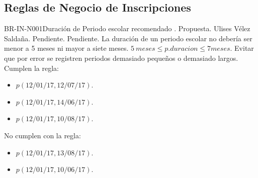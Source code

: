 
\subsection{Reglas de Negocio de Inscripciones}

\begin{BusinessRule}{BR-IN-N001}{Duración de Periodo escolar recomendado }
	{\bcCondition}    %
	{\btEnabler}     %
	{\blInfluencing}    %
	.
	\BRItem[Estado] Propuesta.
	 Ulises Vélez Saldaña.
	 Pendiente.
	 Pendiente.
	\BRItem[Descripción] La duración de un periodo escolar no debería ser menor a 5 meses ni mayor a siete meses.
	\BRItem[Sentencia] $5~{}meses \leq p.duracion \leq 7{}meses$.
	\BRItem[Motivación] Evitar que por error se registren periodos demasiado pequeños o demasiado largos.
	 Cumplen la regla:
		\begin{itemize}
			\item $p(12/01/17, 12/07/17)$.
			\item $p(12/01/17, 14/06/17)$.
			\item $p(12/01/17, 10/08/17)$.
		\end{itemize}
	 No cumplen con la regla:
		\begin{itemize}
			\item $p(12/01/17, 13/08/17)$.
			\item $p(12/01/17, 10/06/17)$.
		\end{itemize}
\end{BusinessRule}

